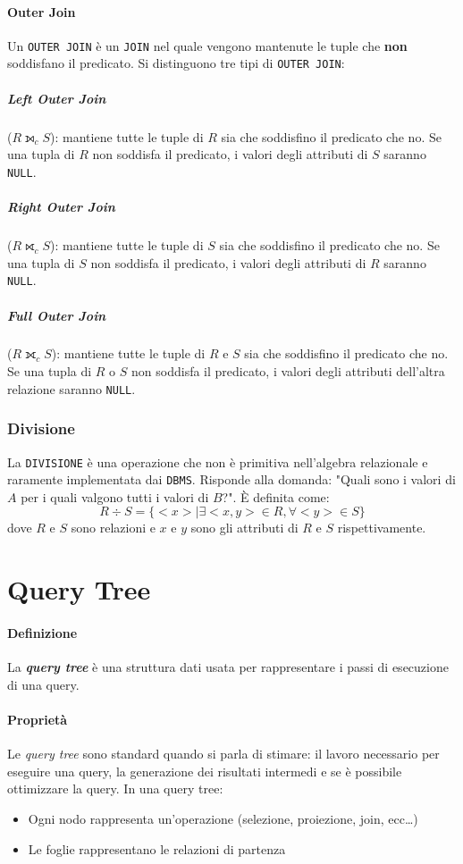             \paragraph{Outer Join} Un \texttt{OUTER JOIN} è un \texttt{JOIN} nel quale vengono mantenute le tuple che \textbf{non} soddisfano il predicato. Si distinguono tre tipi di \texttt{OUTER JOIN}:
                \subparagraph{Left Outer Join} ($ R \leftouterjoin_c S $): mantiene tutte le tuple di $ R $ sia che soddisfino il predicato che no. Se una tupla di $ R $ non soddisfa il predicato, i valori degli attributi di $ S $ saranno \texttt{NULL}.
                \subparagraph{Right Outer Join} ($ R \rightouterjoin_c S $): mantiene tutte le tuple di $ S $ sia che soddisfino il predicato che no. Se una tupla di $ S $ non soddisfa il predicato, i valori degli attributi di $ R $ saranno \texttt{NULL}.
                \subparagraph{Full Outer Join} ($ R \fullouterjoin_c S $): mantiene tutte le tuple di $ R $ e $ S $ sia che soddisfino il predicato che no. Se una tupla di $ R $ o $ S $ non soddisfa il predicato, i valori degli attributi dell'altra relazione saranno \texttt{NULL}.
        \subsubsection{Divisione}
            La \texttt{DIVISIONE} è una operazione che non è primitiva nell'algebra relazionale e raramente implementata dai \texttt{DBMS}. Risponde alla domanda: "Quali sono i valori di $ A $ per i quali valgono tutti i valori di $ B $?". È definita come:
            $$
                R \div S = \{ <x>|\exists <x,y>\in R, \forall <y> \in S \}
            $$
            dove $ R $ e $ S $ sono relazioni e $ x $ e $ y $ sono gli attributi di $ R $ e $ S $ rispettivamente.
\section{Query Tree}
    \paragraph{Definizione} La \textbf{\textit{query tree}} è una struttura dati usata per rappresentare i passi di esecuzione di una query. 
    \paragraph{Proprietà} Le \textit{query tree} sono standard quando si parla di stimare: il lavoro necessario per eseguire una query, la generazione dei risultati intermedi e se è possibile ottimizzare la query. In una query tree:
        \begin{itemize}
            \item Ogni nodo rappresenta un'operazione (selezione, proiezione, join, ecc\dots)
            \item Le foglie rappresentano le relazioni di partenza
        \end{itemize}
